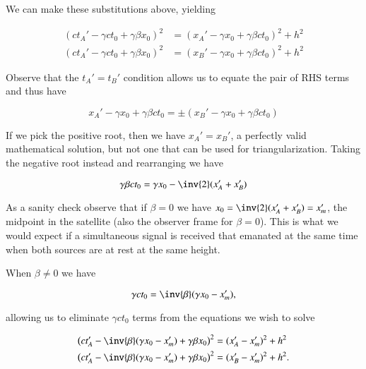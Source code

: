 {We can make these substitutions above, yielding

\begin{equation}\label{eqn:relElectroDynProblemSet1:1260}
\begin{aligned}
( c t_A' - \gamma c t_0 + \gamma \beta x_0)^2 &= (x_A' - \gamma x_0 + \gamma \beta c t_0 )^2 + h^2 \\
( c t_A' - \gamma c t_0 + \gamma \beta x_0)^2 &= (x_B' - \gamma x_0 + \gamma \beta c t_0 )^2 + h^2
\end{aligned}
\end{equation}

Observe that the \(t_A' = t_B'\) condition allows us to equate the pair of RHS terms and thus have

\begin{equation}\label{eqn:relElectroDynProblemSet1:1280}
x_A' - \gamma x_0 + \gamma \beta c t_0 = \pm (x_B' - \gamma x_0 + \gamma \beta c t_0 )
\end{equation}

If we pick the positive root, then we have \(x_A' = x_B'\), a perfectly valid mathematical solution, but not one that can be used for triangularization.  Taking the negative root instead and rearranging we have

\begin{equation}\label{eqn:relElectroDynProblemSet1:1301}
\gamma \beta c t_0 = \gamma x_0 - \inv{2}(x_A' + x_B')
\end{equation}

As a sanity check observe that if \(\beta = 0\) we have \(x_0 = \inv{2}(x_A' + x_B') = x_m'\), the midpoint in the satellite (also the observer frame for \(\beta = 0\)).  This is what we would expect if a simultaneous signal is received that emanated at the same time when both sources are at rest at the same height.

When \(\beta \ne 0\) we have

\begin{equation}\label{eqn:relElectroDynProblemSet1:1302}
\gamma c t_0 = \inv{\beta}(\gamma x_0 - x_m'),
\end{equation}

allowing us to eliminate \(\gamma c t_0\) terms from the equations we wish to solve

\begin{equation}\label{eqn:relElectroDynProblemSet1:1262}
\begin{aligned}
\left( c t_A' - \inv{\beta}( \gamma x_0 - x_m') + \gamma \beta x_0 \right)^2 &= (x_A' - x_m')^2 + h^2 \\
\left( c t_A' - \inv{\beta}( \gamma x_0 - x_m') + \gamma \beta x_0 \right)^2 &= (x_B' - x_m')^2 + h^2.
\end{aligned}
\end{equation}

}
